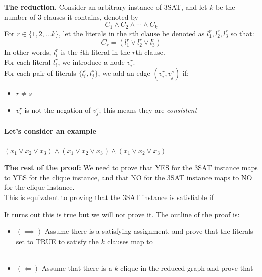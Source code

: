 \documentclass[11  pt]{article}
\begin{document}
\textbf{The reduction.} Consider an arbitrary instance of 3SAT, and let $k$ be the number of 3-clauses it contains, denoted by
\begin{equation}
	C_1 \land C_2 \land \cdots \land C_k
\end{equation}
For $r  \in \{1,2, \hdots k\}$, let the literals in the $r$th clause be denoted as $l_1^r, l_2^r, l_3^r$ so that: 
\begin{equation}
	C_r = (l_1^r \lor l_2^r \lor l_3^r)
\end{equation}
In other words, $l_i^r$ is the $i$th literal in the $r$th clause.\\

For each literal $l_i^r$, we introduce a node $v_i^r$. \\


For each pair of literals $\{l_i^r, l_j^s\}$, we add an edge $(v_i^r, v_j^s)$ if:
\begin{itemize}
	\item $r \neq s$ 
	\item $v_i^r$ is not the negation of $v_j^s$; this means they are \emph{consistent}
\end{itemize}

\paragraph{Let's consider an example} $(x_1 \lor \overline{x}_2 \lor \overline{x}_3) \land (\overline{x}_1 \lor x_2 \lor x_3) \land (x_1 \lor x_2 \lor x_3)$

\newpage
\textbf{The rest of the proof:} We need to prove that YES for the 3SAT instance maps to YES for the clique instance, and that NO for the 3SAT instance maps to NO for the clique instance.\\

This is equivalent to proving that the 3SAT instance is satisfiable if 

\vs{2cm}


It turns out this is true but we will not prove it. The outline of the proof is:

\begin{itemize}
	\item $(\implies)$ Assume there is a satisfying assignment, and prove that the literals set to TRUE to satisfy the $k$ clauses map to \\ \\
	\item $(\Longleftarrow)$ Assume that there is a $k$-clique in the reduced graph and prove that 
\end{itemize}
\end{document}
